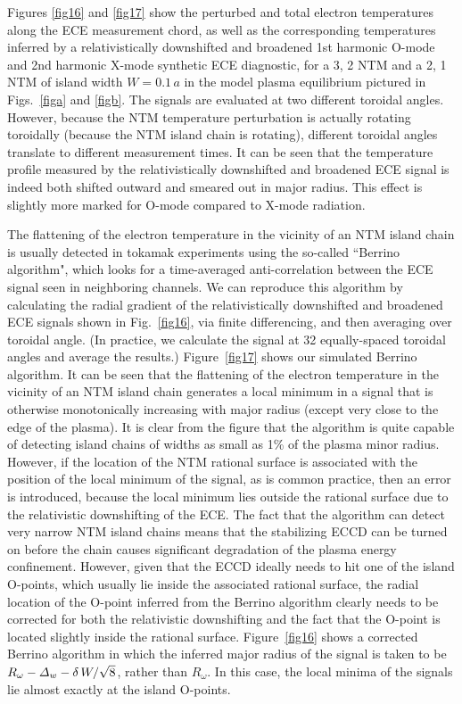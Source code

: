 \documentclass[12pt,prb,aps]{revtex4-1}
\begin{document}
Figures \ref{fig16} and \ref{fig17} show the perturbed and total electron temperatures along the ECE measurement chord, as well as the corresponding temperatures inferred by a relativistically 
downshifted and broadened 1st harmonic O-mode and 2nd harmonic X-mode synthetic ECE diagnostic, for a
3, 2 NTM and a 2, 1 NTM of island width $W=0.1\,a$  in the model plasma equilibrium pictured in Figs.~\ref{figa} and \ref{figb}. 
The signals are evaluated at two different toroidal angles. However, because the
NTM temperature perturbation is actually rotating toroidally (because the NTM island chain is rotating), different toroidal angles translate to different measurement times. It can be seen that the temperature profile measured by the relativistically downshifted and 
broadened ECE signal is indeed both shifted outward and  smeared out in major radius. This effect is slightly more marked for O-mode compared to X-mode radiation. 

The flattening of the electron temperature in the vicinity of an NTM island chain is usually detected in tokamak experiments using the so-called ``Berrino algorithm", which looks for
a time-averaged anti-correlation between the ECE signal seen in neighboring channels.\cite{ece4}  We can  reproduce this algorithm  by calculating the radial gradient of
the relativistically downshifted and broadened ECE signals shown in Fig.~\ref{fig16}, via finite differencing,  and then averaging over toroidal angle. (In practice, we
calculate the signal at 32 equally-spaced toroidal angles and average the results.) Figure~\ref{fig17} shows our simulated Berrino algorithm. It can be seen that the
flattening of the electron temperature in the vicinity of an NTM island chain generates a local minimum in a signal that is otherwise monotonically increasing with major radius (except very close to
the edge of the plasma). It is clear from the figure that the algorithm is quite capable of detecting island chains of widths as small as 1\% of the plasma minor radius. 
However, if the location of the NTM rational surface is associated with the position of the local minimum of the signal, as is common practice,\cite{ece4}  then an error is introduced, because the
local minimum lies outside the rational surface due to the relativistic downshifting of the ECE. The fact that the algorithm can detect very narrow NTM island chains means that the stabilizing ECCD can be turned on before the chain causes significant
degradation of the plasma energy confinement. However, given that the ECCD ideally needs to hit one of the island O-points, which usually lie inside the associated rational 
surface, the radial location of the O-point inferred from the Berrino algorithm clearly needs to be corrected for both the relativistic downshifting and the fact that the O-point
is located slightly inside the rational surface. Figure~\ref{fig16} shows a corrected Berrino algorithm  in which the inferred major
radius of the signal is taken to be $R_\omega-{\mit\Delta}_w-\delta\,W/\sqrt{8}$, rather than $R_\omega$. In this case, the  local minima of the signals lie almost exactly
at the island O-points. 
 
\end{document}
